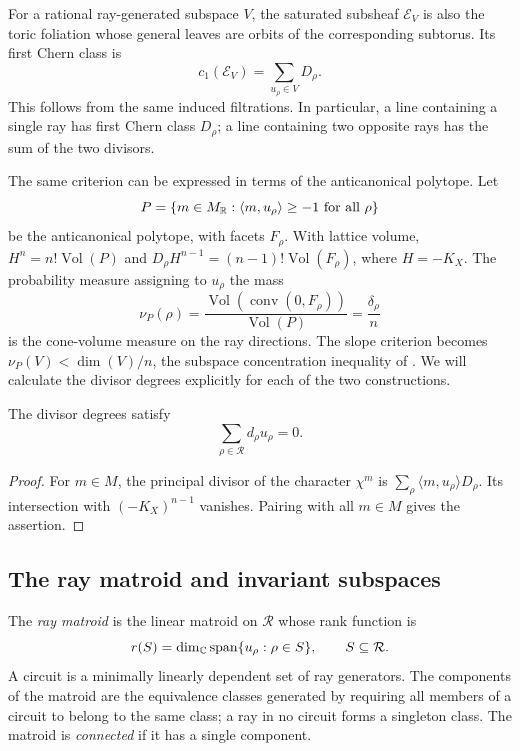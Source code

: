 For a rational ray-generated subspace $V$, the saturated subsheaf
$\mathcal E_V$ is also the toric foliation whose general leaves are
orbits of the corresponding subtorus. Its first Chern class is
\[
 c_1(\mathcal E_V)=\sum_{u_\rho\in V}D_\rho.
\]
This follows from the same induced filtrations. In particular, a line
containing a single ray has first Chern class $D_\rho$; a line containing
two opposite rays has the sum of the two divisors.

The same criterion can be expressed in terms of the anticanonical
polytope. Let
\[
 P=\{m\in M_{\mathbb{R}}:\langle m,u_\rho\rangle\ge-1
                    \text{ for all }\rho\}
\]
be the anticanonical polytope, with facets $F_\rho$. With lattice volume,
$H^n=n!\operatorname{Vol}(P)$ and
$D_\rho H^{n-1}=(n-1)!\operatorname{Vol}(F_\rho)$, where $H=-K_X$.
The probability measure assigning to $u_\rho$ the mass
\[
 \nu_P(\rho)=\frac{\operatorname{Vol}(\operatorname{conv}(0,F_\rho))}
                  {\operatorname{Vol}(P)}
            =\frac{\delta_\rho}{n}
\]
is the cone-volume measure on the ray directions. The slope criterion
becomes $\nu_P(V)<\dim(V)/n$, the subspace concentration inequality
of \cite{HeringNillSuess2022}. We will calculate the divisor degrees
explicitly for each of the two constructions.

\begin{lemma}\label{lem:degreerelation}
The divisor degrees satisfy
\[
 \sum_{\rho\in\mathcal R}d_\rho u_\rho=0.
\]
\end{lemma}

\begin{proof}
For $m\in M$, the principal divisor of the character $\chi^m$ is
$\sum_\rho\langle m,u_\rho\rangle D_\rho$. Its intersection with
$(-K_X)^{n-1}$ vanishes. Pairing with all $m\in M$ gives the assertion.
\end{proof}

\subsection{The ray matroid and invariant subspaces}

The \emph{ray matroid} is the linear matroid on $\mathcal R$ whose rank
function is
\[
 r(S)=\dim_{\mathbb{C}}\operatorname{span}\{u_\rho:\rho\in S\},
 \qquad S\subseteq\mathcal R.
\]
A circuit is a minimally linearly dependent set of ray generators.
The components of the matroid are the equivalence classes generated by
requiring all members of a circuit to belong to the same class; a ray
in no circuit forms a singleton class. The matroid is \emph{connected}
if it has a single component.

